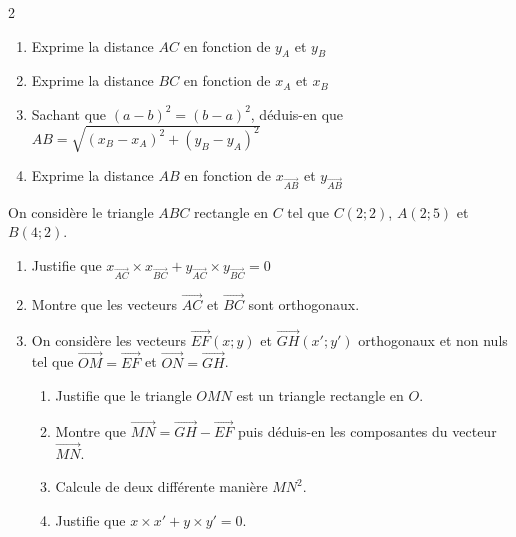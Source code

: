 \begin{multicols*}{2}
\begin{minipage}{5cm}
  		\begin{enumerate}
  			\item Exprime la distance $AC$ en fonction de $y_A$ et $y_B$
  			\item Exprime la distance $BC$ en fonction de $x_A$ et $x_B$
  			\item Sachant que $(a - b)^2 = (b - a)^2$, déduis-en que $AB = \sqrt{(x_B - x_A)^2 + (y_B - y_A)^2}$
  			\item Exprime la distance $AB$ en fonction de $x_{\overrightarrow{AB}}$ et $y_{\overrightarrow{AB}}$
  		\end{enumerate}
  	\end{minipage}
  	\dures
  	 
  	
  	On considère le triangle $ ABC $ rectangle en $ C $ tel que $ C(2;2) $, $ A(2;5) $ et $ B(4;2) $.
  	\begin{enumerate}
  		\item Justifie que $ x_{\overrightarrow{AC}}\times x_{\overrightarrow{BC}}+y_{\overrightarrow{AC}}\times y_{\overrightarrow{BC}}=0 $
  		\item Montre que les vecteurs $ \overrightarrow{AC} $ et $ \overrightarrow{BC} $ sont orthogonaux.
  		\item On considère les vecteurs $ \overrightarrow{EF}(x;y) $ et $ \overrightarrow{GH}(x';y') $ orthogonaux et non nuls tel que $ \overrightarrow{OM}=\overrightarrow{EF} $ et $ \overrightarrow{ON}=\overrightarrow{GH} $.
  		\begin{enumerate}
  			\item Justifie que le triangle $ OMN $ est un triangle rectangle en $ O $.
  			\item Montre que $ \overrightarrow{MN}=\overrightarrow{GH}-\overrightarrow{EF} $ puis déduis-en les composantes du vecteur $ \overrightarrow{MN} $.
  			\item Calcule de deux différente manière $ MN^2 $.
  			\item Justifie que $ x\times x'+y\times y'=0 $.
  		\end{enumerate}
  	\end{enumerate}
  	\dures
  	 

\end{multicols*}
